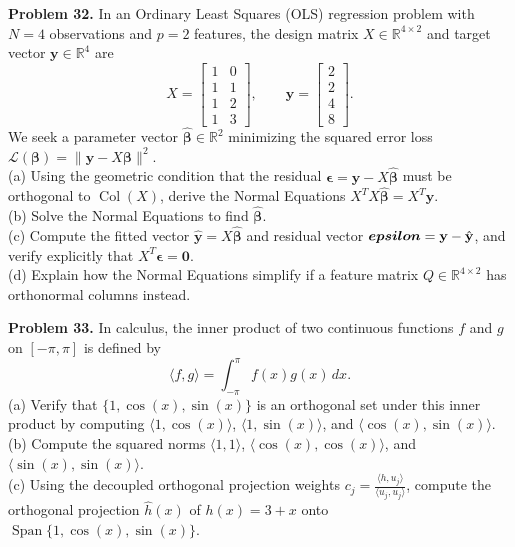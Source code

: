 \documentclass[11pt, letterpaper]{article}
\theoremstyle{definition}
\theoremstyle{remark}
\begin{document}
\textbf{Problem 32.} In an Ordinary Least Squares (OLS) regression problem with $N = 4$ observations and $p = 2$ features, the design matrix $X \in \mathbb{R}^{4 \times 2}$ and target vector $\mathbf{y} \in \mathbb{R}^4$ are
\[
X = \begin{bmatrix} 1 & 0 \\ 1 & 1 \\ 1 & 2 \\ 1 & 3 \end{bmatrix}, \qquad
\mathbf{y} = \begin{bmatrix} 2 \\ 2 \\ 4 \\ 8 \end{bmatrix}.
\]
We seek a parameter vector $\hat{\boldsymbol{\beta}} \in \mathbb{R}^2$ minimizing the squared error loss $\mathcal{L}(\boldsymbol{\beta}) = \|\mathbf{y} - X\boldsymbol{\beta}\|^2$. \\
(a) Using the geometric condition that the residual $\boldsymbol{\epsilon} = \mathbf{y} - X\hat{\boldsymbol{\beta}}$ must be orthogonal to $\operatorname{Col}(X)$, derive the Normal Equations $X^T X \hat{\boldsymbol{\beta}} = X^T \mathbf{y}$. \\
(b) Solve the Normal Equations to find $\hat{\boldsymbol{\beta}}$. \\
(c) Compute the fitted vector $\hat{\mathbf{y}} = X\hat{\boldsymbol{\beta}}$ and residual vector $\boldsymbol{\\epsilon} = \mathbf{y} - \hat{\mathbf{y}}$, and verify explicitly that $X^T \boldsymbol{\epsilon} = \mathbf{0}$. \\
(d) Explain how the Normal Equations simplify if a feature matrix $Q \in \mathbb{R}^{4 \times 2}$ has orthonormal columns instead.

\textbf{Problem 33.} In calculus, the inner product of two continuous functions $f$ and $g$ on $[-\pi, \pi]$ is defined by
\[
\langle f, g \rangle = \int_{-\pi}^{\pi} f(x)g(x)\,dx.
\]
(a) Verify that $\{1, \cos(x), \sin(x)\}$ is an orthogonal set under this inner product by computing $\langle 1, \cos(x) \rangle$, $\langle 1, \sin(x) \rangle$, and $\langle \cos(x), \sin(x) \rangle$. \\
(b) Compute the squared norms $\langle 1, 1 \rangle$, $\langle \cos(x), \cos(x) \rangle$, and $\langle \sin(x), \sin(x) \rangle$. \\
(c) Using the decoupled orthogonal projection weights $c_j = \frac{\langle h, u_j \rangle}{\langle u_j, u_j \rangle}$, compute the orthogonal projection $\hat{h}(x)$ of $h(x) = 3 + x$ onto $\operatorname{Span}\{1, \cos(x), \sin(x)\}$.
\end{document}
